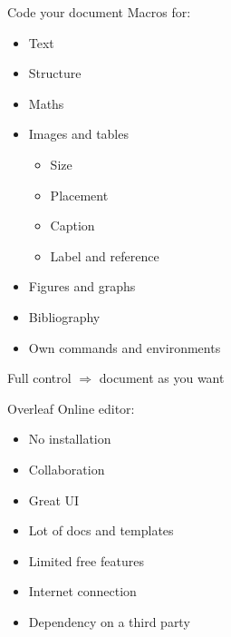 \documentclass[show notes on second screen=right]{beamer}
\begin{document}
\begin{frame}[t]{Code your document}
  \onslide<+->
  Macros for:
  \onslide<+->
  \begin{itemize}
    \item Text
    \item Structure
    \item Maths
    \item Images and tables
    \begin{itemize}
      \item Size
      \item Placement
      \item Caption
      \item Label and reference
    \end{itemize}
    \item Figures and graphs
    \item Bibliography
    \item Own commands and environments
  \end{itemize}
  \onslide<+->
  Full control \(\Rightarrow\) document as you want
\end{frame}

\begin{frame}[t]{Overleaf}
  \onslide<+->
  Online editor:
  \onslide<+->
  \begin{itemize}
    \item[+] No installation
    \item[+] Collaboration 
    \item[+] Great UI
    \item[+] Lot of docs and templates
    \item[-] Limited free features
    \item[-] Internet connection
    \item[-] Dependency on a third party
  \end{itemize}
\end{frame}

\end{document}

